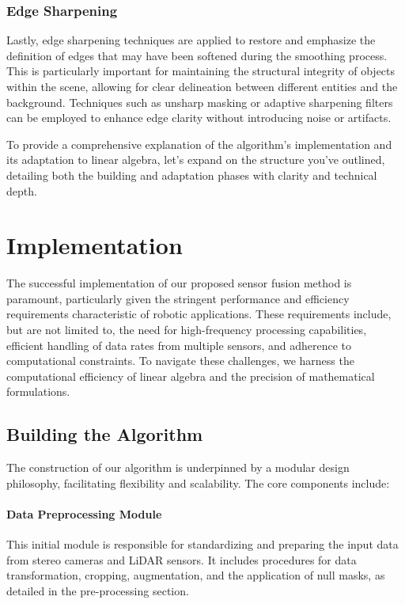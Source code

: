 \documentclass[conference]{IEEEtran}
\begin{document}
\subsubsection{Edge Sharpening}

Lastly, edge sharpening techniques are applied to restore and emphasize the definition of edges that may have been softened during the smoothing process. This is particularly important for maintaining the structural integrity of objects within the scene, allowing for clear delineation between different entities and the background. Techniques such as unsharp masking or adaptive sharpening filters can be employed to enhance edge clarity without introducing noise or artifacts.


To provide a comprehensive explanation of the algorithm's implementation and its adaptation to linear algebra, let's expand on the structure you've outlined, detailing both the building and adaptation phases with clarity and technical depth.

\section{Implementation} \label{implementation}

The successful implementation of our proposed sensor fusion method is paramount, particularly given the stringent performance and efficiency requirements characteristic of robotic applications. These requirements include, but are not limited to, the need for high-frequency processing capabilities, efficient handling of data rates from multiple sensors, and adherence to computational constraints. To navigate these challenges, we harness the computational efficiency of linear algebra and the precision of mathematical formulations.

\subsection{Building the Algorithm}

The construction of our algorithm is underpinned by a modular design philosophy, facilitating flexibility and scalability. The core components include:

\paragraph{Data Preprocessing Module} 
This initial module is responsible for standardizing and preparing the input data from stereo cameras and LiDAR sensors. It includes procedures for data transformation, cropping, augmentation, and the application of null masks, as detailed in the pre-processing section.
\end{document}
